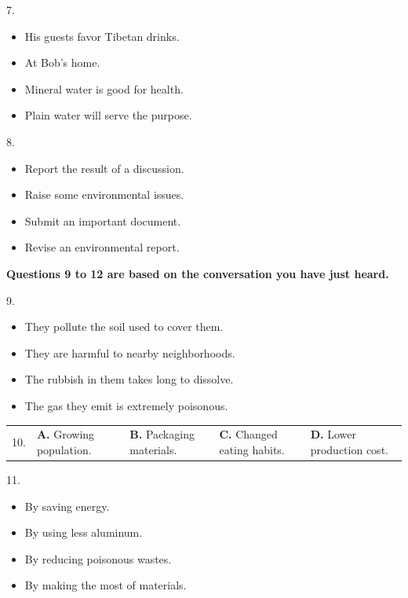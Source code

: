 \documentclass[UTF8,11pt]{ctexart}
\begin{document}
7.


\begin{itemize}[leftmargin=2em,itemsep=.2em,topsep=.4em]\item[A.] His guests favor Tibetan drinks.
\item[B.] At Bob’s home.
\item[C.] Mineral water is good for health.
\item[D.] Plain water will serve the purpose.
\end{itemize}

8.


\begin{itemize}[leftmargin=2em,itemsep=.2em,topsep=.4em]\item[A.] Report the result of a discussion.
\item[B.] Raise some environmental issues.
\item[C.] Submit an important document.
\item[D.] Revise an environmental report.
\end{itemize}

\textbf{Questions 9 to 12 are based on the conversation you have just heard.}


9.


\begin{itemize}[leftmargin=2em,itemsep=.2em,topsep=.4em]\item[A.] They pollute the soil used to cover them.
\item[B.] They are harmful to nearby neighborhoods.
\item[C.] The rubbish in them takes long to dissolve.
\item[D.] The gas they emit is extremely poisonous.
\end{itemize}

\noindent\begin{tabularx}{\linewidth}{@{}lXXXX@{}}10. & \textbf{A.} Growing population. & \textbf{B.} Packaging materials. & \textbf{C.} Changed eating habits. & \textbf{D.} Lower production cost.\\\end{tabularx}\par

11.


\begin{itemize}[leftmargin=2em,itemsep=.2em,topsep=.4em]\item[A.] By saving energy.
\item[B.] By using less aluminum.
\item[C.] By reducing poisonous wastes.
\item[D.] By making the most of materials.
\end{itemize}
\end{document}
